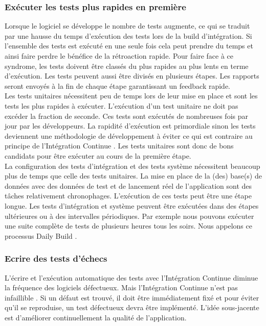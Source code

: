       \subsubsection{Exécuter les tests plus rapides en première}
      Lorsque le logiciel se développe le nombre de tests augmente, ce qui se traduit par une hausse du temps d’exécution des tests lors de la build d’intégration. Si l’ensemble des tests est exécuté en une seule fois cela peut prendre du temps et ainsi faire perdre le bénéfice de la rétroaction rapide. Pour faire face à ce syndrome, les tests doivent être classés du plus rapides au plus lents en terme d’exécution. Les tests peuvent aussi être divisés en plusieurs étapes. Les rapports seront envoyés à la fin de chaque étape garantissant un feedback rapide.\\

      Les tests unitaires nécessitent peu de temps lors de leur mise en place et sont les tests les plus rapides à exécuter. L’exécution d’un test unitaire ne doit pas excéder la fraction de seconde. Ces tests sont exécutés de nombreuses fois par jour par les développeurs. La rapidité d’exécution est primordiale sinon les tests deviennent une méthodologie de développement à éviter ce qui est contraire au principe de l’Intégration Continue \cite{Duv07}. Les tests unitaires sont donc de bons candidats pour être exécuter au cours de la première étape.\\

      La configuration des tests d'intégration et des tests système nécessitent beaucoup plus de temps que celle des tests unitaires. La mise en place de la (des) base(s) de données avec des données de test et de lancement réel de l’application sont des tâches relativement chronophages. L’exécution de ces tests peut être une étape longue. Les tests d’intégration et système peuvent être exécutées dans des étapes ultérieures ou à des intervalles périodiques. Par exemple nous pouvons exécuter une suite complète de tests de plusieurs heures tous les soirs. Nous appelons ce processus Daily Build \cite{McC96}.

      \subsubsection{Ecrire des tests d’échecs}
      L’écrire et l’exécution automatique des tests avec l’Intégration Continue diminue la fréquence des logiciels défectueux. Mais l’Intégration Continue n’est pas infaillible \cite{Duv07}. Si un défaut est trouvé, il doit être immédiatement fixé et pour éviter qu'il se reproduise, un test défectueux devra être implémenté. L'idée sous-jacente est d’améliorer continuellement la qualité de l’application.

